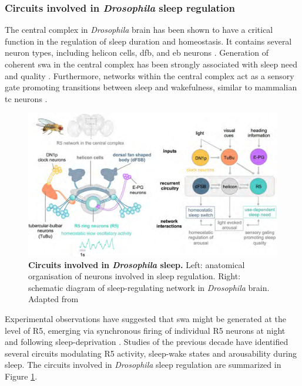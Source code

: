 \documentclass[../main.tex]{subfiles}
\begin{document}
\subsubsection{Circuits involved in \textit{Drosophila} sleep regulation} \label{subsubsec:circuits_in_droso_sleep}

The central complex in \textit{Drosophila} brain has been shown to have a critical function in the regulation of sleep duration and homeostasis. It contains several neuron types, including helicon cells, \gls{dfb}, and \gls{eb} neurons \parencite{shaferRegulationDrosophilaSleep2021}.
Generation of coherent \gls{swa} in the central complex has been strongly associated with sleep need and quality \parencite{suarez-grimaltNeuralArchitectureSleep2021,raccugliaNetworkSpecificSynchronizationElectrical2019}.
Furthermore, networks within the central complex act as a sensory gate promoting transitions between sleep and wakefulness, similar to mammalian \gls{tc} neurons \parencite{raccugliaCoherentMultilevelNetwork2022,gentThalamicDualControl2018}.

\begin{figure}[!b]
    \centering
    \includegraphics[width=\linewidth]{../img/sleep_and_r5_network/sleep_circuit_suarez.png}
    \caption[Circuits involved in \textit{Drosophila} sleep]{
        \textbf{Circuits involved in \textit{Drosophila} sleep.}
        Left: anatomical organisation of neurons involved in sleep regulation. Right: schematic diagram of sleep-regulating network in \textit{Drosophila} brain.
        Adapted from \parencite{suarez-grimaltNeuralArchitectureSleep2021}
    }
    \label{fig:droso_sleep_circuit}
\end{figure}

Experimental observations have suggested that \gls{swa} might be generated at the level of R5, emerging via synchronous firing of individual R5 neurons at night and following sleep-deprivation \parencite{raccugliaNetworkSpecificSynchronizationElectrical2019}.
Studies of the previous decade have identified several circuits modulating R5 activity, sleep-wake states and arousability during sleep. The circuits involved in \textit{Drosophila} sleep regulation are summarized in Figure \ref{fig:droso_sleep_circuit}.
\end{document}
